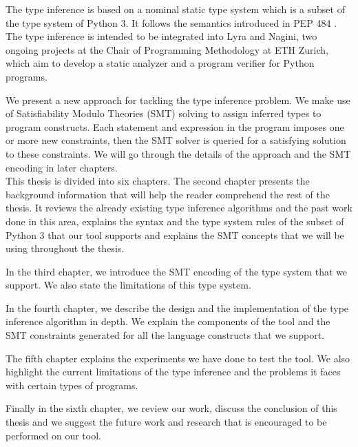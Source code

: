 The type inference is based on a nominal static type system which is a subset of the type system of Python 3. It follows the semantics introduced in PEP 484 \cite{484}. The type inference is intended to be integrated into Lyra and Nagini, two ongoing projects at the Chair of Programming Methodology at ETH Zurich, which aim to develop a static analyzer and a program verifier for Python programs.

We present a new approach for tackling the type inference problem. We make use of Satisfiability Modulo Theories (SMT) solving to assign inferred types to program constructs. Each statement and expression in the program imposes one or more new constraints, then the SMT solver is queried for a satisfying solution to these constraints. We will go through the details of the approach and the SMT encoding in later chapters.\\
 
This thesis is divided into six chapters. The second chapter presents the background information that will help the reader comprehend the rest of the thesis. It reviews the already existing type inference algorithms and the past work done in this area, explains the syntax and the type system rules of the subset of Python 3 that our tool supports and explains the SMT concepts that we will be using throughout the thesis.

In the third chapter, we introduce the SMT encoding of the type system that we support. We also state the limitations of this type system.

In the fourth chapter, we describe the design and the implementation of the type inference algorithm in depth. We explain the components of the tool and the SMT constraints generated for all the language constructs that we support.

The fifth chapter explains the experiments we have done to test the tool. We also highlight the current limitations of the type inference and the problems it faces with certain types of programs.

Finally in the sixth chapter, we review our work, discuss the conclusion of this thesis and we suggest the future work and research that is encouraged to be performed on our tool.